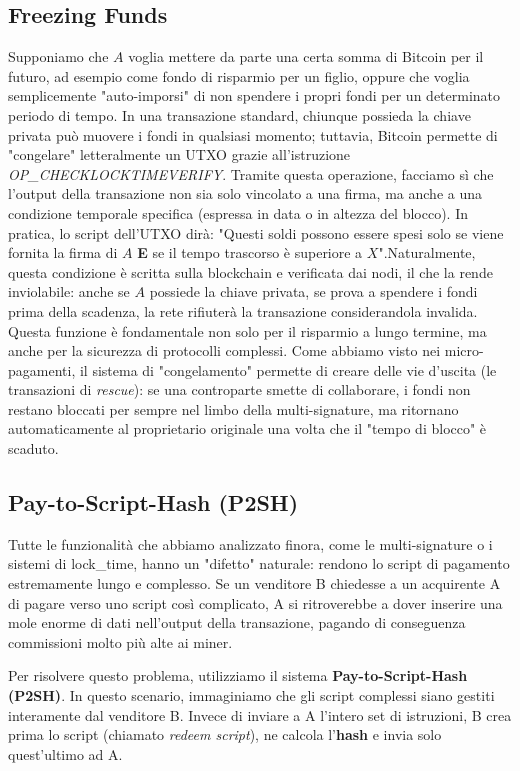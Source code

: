 \subsection{Freezing Funds}
Supponiamo che $A$ voglia mettere da parte una certa somma di Bitcoin per il futuro, ad esempio come fondo di risparmio per un figlio, oppure che voglia semplicemente "auto-imporsi" di non spendere i propri fondi per un determinato periodo di tempo. In una transazione standard, chiunque possieda la chiave privata può muovere i fondi in qualsiasi momento; tuttavia, Bitcoin permette di "congelare" letteralmente un UTXO grazie all'istruzione \textit{OP\_CHECKLOCKTIMEVERIFY}.
Tramite questa operazione, facciamo sì che l'output della transazione non sia solo vincolato a una firma, ma anche a una condizione temporale specifica (espressa in data o in altezza del blocco). 
In pratica, lo script dell'UTXO dirà: "Questi soldi possono essere spesi solo se viene fornita la firma di $A$ \textbf{E} se il tempo trascorso è superiore a $X$".Naturalmente, questa condizione è scritta sulla blockchain e verificata dai nodi, il che la rende inviolabile: anche se $A$ possiede la chiave privata, se prova a spendere i fondi prima della scadenza, la rete rifiuterà la transazione considerandola invalida.
Questa funzione è fondamentale non solo per il risparmio a lungo termine, ma anche per la sicurezza di protocolli complessi. Come abbiamo visto nei micro-pagamenti, il sistema di "congelamento" permette di creare delle vie d'uscita (le transazioni di \textit{rescue}): se una controparte smette di collaborare, i fondi non restano bloccati per sempre nel limbo della multi-signature, ma ritornano automaticamente al proprietario originale una volta che il "tempo di blocco" è scaduto.

\subsection{Pay-to-Script-Hash (P2SH)}
Tutte le funzionalità che abbiamo analizzato finora, come le multi-signature o i sistemi di lock\_time, hanno un "difetto" naturale: rendono lo script di pagamento estremamente lungo e complesso. Se un venditore B chiedesse a un acquirente A di pagare verso uno script così complicato, A si ritroverebbe a dover inserire una mole enorme di dati nell'output della transazione, pagando di conseguenza commissioni molto più alte ai miner.

Per risolvere questo problema, utilizziamo il sistema \textbf{Pay-to-Script-Hash (P2SH)}. In questo scenario, immaginiamo che gli script complessi siano gestiti interamente dal venditore B. Invece di inviare a A l'intero set di istruzioni, B crea prima lo script (chiamato \textit{redeem script}), ne calcola l'\textbf{hash} e invia solo quest'ultimo ad A.

